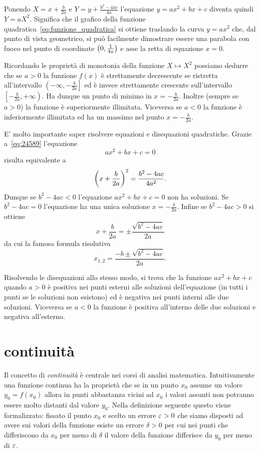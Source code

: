 Ponendo $X=x+\frac b{2a}$ e $Y=y+\frac{b^2-4ac}{4a}$
l'equazione $y=ax^2+bx+c$ diventa quindi $Y=aX^2$. Significa
che il grafico della funzione quadratica~\eqref{eq:funzione_quadratica}
si ottiene traslando la curva $y=a x^2$ che, dal punto di vista
geometrico, si può facilmente
dimostrare essere una parabola con fuoco
nel punto di coordinate ${\left( 0,\frac 1 {4a} \right)}$
e asse la retta di equazione $x=0$.

Ricordando le proprietà di monotonia della funzione $X\mapsto X^2$
possiamo dedurre che se $a>0$ la funzione $f(x)$ è strettamente
decrescente se ristretta all'intervallo $\left(-\infty,-\frac b {2a}\right]$ ed è invece strettamente crescente sull'intervallo $\left[-\frac b{2a},+\infty\right)$. Ha dunque un punto di minimo in $x=-\frac{b}{2a}$.
Inoltre (sempre se $a>0$) la funzione è superiormente illimitata.
Viceversa se $a<0$ la funzione è inferiormente illimitata ed ha un massimo nel punto $x=-\frac{b}{2a}$.

E' molto importante saper risolvere equazioni e disequazioni
quadratiche. Grazie a~\eqref{eq:24589} l'equazione
\[
 a x^2 + bx + c = 0
\]
risulta equivalente a
\[
  {\left( x+\frac{b}{2a} \right)}^2 = \frac{b^2-4ac}{4a^2}.
\]
Dunque se $b^2-4ac<0$ l'equazione $ax^2+bx+c=0$ non ha soluzioni.
Se $b^2-4ac=0$ l'equazione ha una unica soluzione $x=-\frac{b}{2a}$.
Infine se $b^2-4ac>0$ si ottiene
\[
  x+\frac b{2a} = \pm \frac{\sqrt{b^2-4ac}}{2a}
\]
da cui la famosa formula risolutiva
\mymark{***}
\begin{equation}\label{eq:secondo_grado}
  x_{1,2} = \frac{-b \pm \sqrt{b^2-4ac}}{2a}.
\end{equation}

Risolvendo le disequazioni allo stesso modo, si trova
che la funzione $ax^2+bx+c$ quando $a>0$ è positiva
nei punti esterni alle soluzioni dell'equazione
(in tutti i punti se le soluzioni non esistono) ed
è negativa nei punti interni alle due soluzioni.
Viceversa se $a<0$ la funzione è positiva all'interno
delle due soluzioni e negativa all'esterno.

\section{continuità}

Il concetto di \emph{continuità} è centrale
nei corsi di analisi matematica.
Intuitivamente una funzione continua ha la proprietà
che se in un punto $x_0$ assume un valore $y_0=f(x_0)$ allora
in punti abbastanza vicini ad $x_0$ i valori assunti
non potranno essere molto distanti dal valore $y_0$.
Nella definizione seguente questo viene formalizzato:
fissato il punto $x_0$ e scelto un errore $\varepsilon>0$
che siamo disposti ad avere sui valori della funzione
esiste un errore $\delta>0$ per cui nei punti
che differiscono da $x_0$ per meno di $\delta$ il valore
della funzione differisce da $y_0$ per meno di $\varepsilon$.

